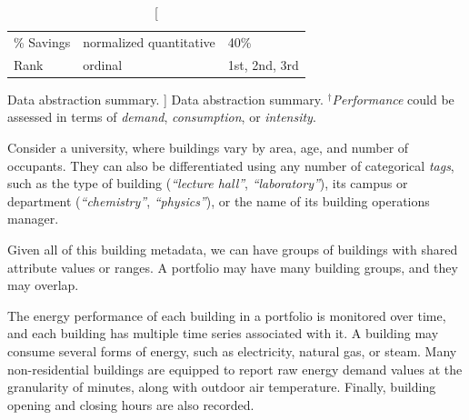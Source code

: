 \begin{table}
\begin{center}
\begin{tabular}{l|l|l}
        \% Savings & normalized quantitative & 40\%
        
        \\
        
        \rowcolor{gray!15}
        
        Rank & ordinal & 1st, 2nd, 3rd
        
        \\
        
        \hline  
        
    \end{tabular}
    \caption
    [
        Data abstraction summary.
    ]
    {
        Data abstraction summary. $^\dagger$\textsl{Performance} could be assessed in terms of \textsl{demand}, \textsl{consumption}, or \textsl{intensity}.
    }
    \label{emu:tab:data-abstractions}
    \end{center}
\end{table}


 Consider a university, where buildings vary by area, age, and number of occupants. 
They can also be differentiated using any number of categorical {\it tags}, such as the type of building ({\it ``lecture hall''}, {\it ``laboratory''}), its campus or department ({\it ``chemistry''}, {\it ``physics''}), or the name of its building operations manager.

 Given all of this building metadata, we can have groups of buildings with shared attribute values or ranges. 
A portfolio may have many building groups, and they may overlap.

 The energy performance of each building in a portfolio is monitored over time, and each building has multiple time series associated with it.
A building may consume several forms of energy, such as electricity, natural gas, or steam.
Many non-residential buildings are equipped to report raw energy demand values at the granularity of minutes, along with outdoor air temperature. 
Finally, building opening and closing hours are also recorded.

